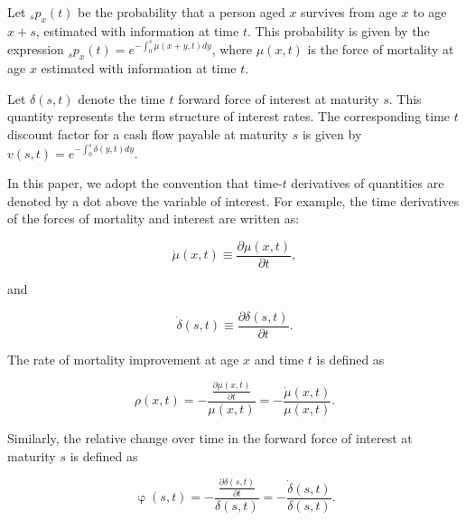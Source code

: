 \documentclass[12pt]{article}
\begin{document}

Let \({}_s p_x(t) \) be the probability that a person aged \( x \) survives from age \( x \) to age \( x+s \), estimated with information at time $t$. This probability is given by the expression ${}_sp_x(t)=e^{-\int_{0}^{s}\mu(x+y,t)dy}$, where \(\mu(x,t)\) is the force of mortality at age \(x\) estimated with information at time $t$.

Let \( \delta(s,t) \) denote the time \( t \) forward force of interest at maturity \( s \). This quantity represents the term structure of interest rates. The corresponding time \( t \) discount factor for a cash flow payable at maturity \( s \) is given by ${v}(s,t)=e^{-\int_{0}^{s}\delta(y,t)dy}$.

In this paper, we adopt the convention that time-$t$ derivatives of quantities are denoted by a dot above the variable of interest. For example, the time derivatives of the forces of mortality and interest are written as:


\begin{equation} \label{eq:mudot}
\dot{\mu}(x,t)\equiv\frac{\partial\mu(x,t)}{\partial t},
\end{equation}

and 

\begin{equation} \label{eq:deltadot}
\dot{\delta}(s,t)\equiv\frac{\partial\delta(s,t)}{\partial t}.
\end{equation}

The rate of mortality improvement at age \(x\) and time $t$ is defined as

\begin{equation} \label{eq:rho}
\rho(x,t)=-\frac{\frac{\partial \mu(x,t)}{\partial t}}{\mu(x,t)} = - \frac{\dot{\mu}(x,t)}{\mu(x,t)}.
\end{equation}

Similarly, the relative change over time in the forward force of interest at maturity $s$ is defined as 

\begin{equation} \label{eq:phi}
\upvarphi(s,t)=-\frac{\frac{\partial \delta(s,t)}{\partial t}}{\delta(s,t)} = -\frac{\dot{\delta}(s,t)}{\delta(s,t)}.
\end{equation}
\end{document}
